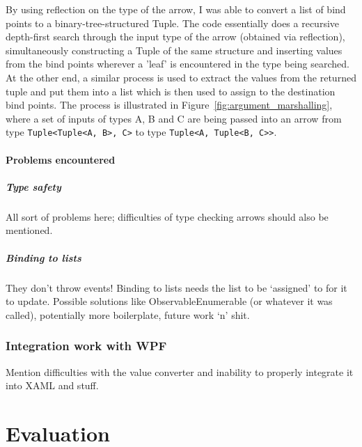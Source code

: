 \documentclass[12pt,twoside,notitlepage]{report}
\begin{document}
By using reflection on the type of the arrow, I was able to convert a list of bind points to a binary-tree-structured Tuple. The code essentially does a recursive depth-first search through the input type of the arrow (obtained via reflection), simultaneously constructing a Tuple of the same structure and inserting values from the bind points wherever a 'leaf' is encountered in the type being searched. At the other end, a similar process is used to extract the values from the returned tuple and put them into a list which is then used to assign to the destination bind points. The process is illustrated in Figure~\ref{fig:argument_marshalling}, where a set of inputs of types A, B and C are being passed into an arrow from type \texttt{Tuple<Tuple<A, B>, C>} to type \texttt{Tuple<A, Tuple<B, C>>}.

\subsubsection{Problems encountered}

\paragraph{Type safety}

All sort of problems here; difficulties of type checking arrows should also be mentioned.

\paragraph{Binding to lists}

They don't throw events! Binding to lists needs the list to be ‘assigned’ to for it to update. Possible solutions like ObservableEnumerable (or whatever it was called), potentially more boilerplate, future work ‘n’ shit.

\subsection{Integration work with WPF}

Mention difficulties with the value converter and inability to properly integrate it into XAML and stuff.

\cleardoublepage



\chapter{Evaluation}
\end{document}

